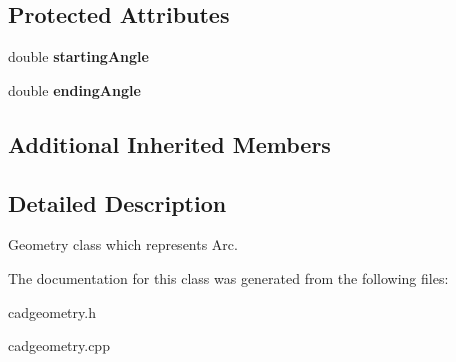 \subsection*{Protected Attributes}
\begin{DoxyCompactItemize}
\item 
double {\bfseries starting\+Angle}\hypertarget{class_c_a_d_arc_a557edf704b996b0d5f4ea4d6c9dcf7bd}{}\label{class_c_a_d_arc_a557edf704b996b0d5f4ea4d6c9dcf7bd}

\item 
double {\bfseries ending\+Angle}\hypertarget{class_c_a_d_arc_a2f38649ca25a867218afd64596a6c8fe}{}\label{class_c_a_d_arc_a2f38649ca25a867218afd64596a6c8fe}

\end{DoxyCompactItemize}
\subsection*{Additional Inherited Members}


\subsection{Detailed Description}
Geometry class which represents Arc. 

The documentation for this class was generated from the following files\+:\begin{DoxyCompactItemize}
\item 
cadgeometry.\+h\item 
cadgeometry.\+cpp\end{DoxyCompactItemize}
